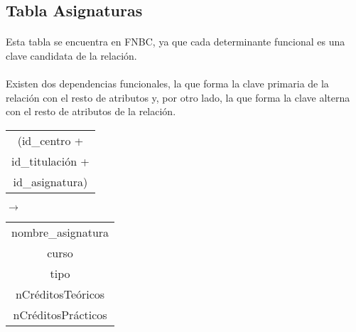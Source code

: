 \subsection{Tabla Asignaturas}

  \paragraph{}Esta tabla se encuentra en FNBC, ya que cada determinante
  funcional es una clave candidata de la relación.

  \paragraph{}Existen dos dependencias funcionales, la que forma la clave
  primaria de la relación con el resto de atributos y, por otro lado, la que
  forma la clave alterna con el resto de atributos de la relación.

 \begin{center}
    \begin{minipage}{4.2cm}{\begin{flushright}\begin{tabular}{ | c | }
                  \hline
                  (id\_centro + \\
                  id\_titulación + \\
                  id\_asignatura) \\
                  \hline
                 \end{tabular}\end{flushright} }
    \end{minipage}
    \begin{minipage}{0.7cm}{$\longrightarrow$}
    \end{minipage}
    \begin{minipage}{5.9cm}{\begin{tabular}{ | c | }
                  \hline
                  nombre\_asignatura \\
                  curso \\
                  tipo \\
                  nCréditosTeóricos \\
                  nCréditosPrácticos \\
                  \hline
                 \end{tabular} }
    \end{minipage}
  \end{center}


